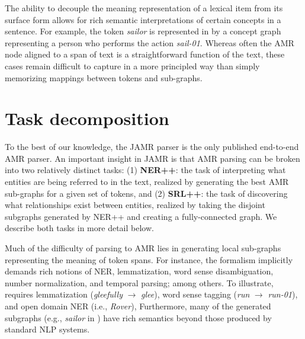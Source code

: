 \documentclass[11pt]{article}
\newcommand\w[1]{\textit{#1}} %
\newcommand\n[1]{\textit{#1}} %
\begin{document}
The ability to decouple the meaning representation of a lexical item from its
  surface form allows for rich semantic interpretations of certain concepts
  in a sentence.
For example, the token \w{sailor} is represented in  by a concept graph 
  representing a person who performs the action \n{sail-01}. 
Whereas often the AMR node aligned to a span of text is a straightforward function
  of the text, these cases remain difficult to capture in a more principled way than
  simply memorizing mappings between tokens and sub-graphs.


\section{Task decomposition}



To the best of our knowledge, the JAMR parser is
the only published end-to-end AMR parser.
An important insight in JAMR is that AMR parsing can be broken into two 
relatively distinct tasks: (1) \textbf{NER++}: the task of interpreting what entities are being referred to in 
the text, realized by generating the best AMR sub-graphs for a given set of tokens, and
(2) \textbf{SRL++}: the task of discovering what 
relationships exist between entities, realized by taking the disjoint subgraphs generated
  by NER++ and creating a fully-connected graph.
We describe both tasks in more detail below.


Much of the difficulty of parsing to AMR lies in generating local sub-graphs representing the meaning of token spans.
For instance, the formalism implicitly demands rich notions of NER, lemmatization, word sense disambiguation, number normalization, and temporal parsing; among others.
To illustrate,  requires lemmatization (\textit{gleefully} $\rightarrow$ \textit{glee}), word sense tagging (\textit{run} $\rightarrow$ \textit{run-01}), and open domain NER (i.e., \textit{Rover}),
Furthermore, many of the generated subgraphs (e.g., \textit{sailor} in ) have rich semantics beyond those produced by standard NLP systems.
\end{document}
